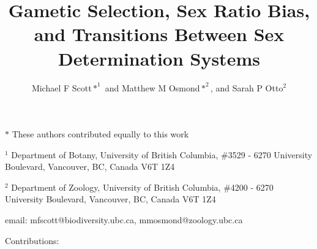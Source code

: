 \documentclass[12pt]{article}
\begin{document}
\title{Gametic Selection, Sex Ratio Bias, and Transitions Between Sex Determination Systems}
\author{Michael F Scott$*^1$ and Matthew M Osmond$*^2$, and Sarah P Otto$^2$}
\date{}
\maketitle
\noindent
$*$ These authors contributed equally to this work

\noindent
$^1$ Department of Botany, University of British Columbia, \#3529 - 6270 University Boulevard, Vancouver, BC, Canada V6T 1Z4

\noindent
$^2$ Department of Zoology, University of British Columbia, \#4200 - 6270 University Boulevard, Vancouver, BC, Canada V6T 1Z4

\noindent
email: mfscott@biodiversity.ubc.ca, mmosmond@zoology.ubc.ca

\noindent
Contributions: 

\newpage
\end{document}

